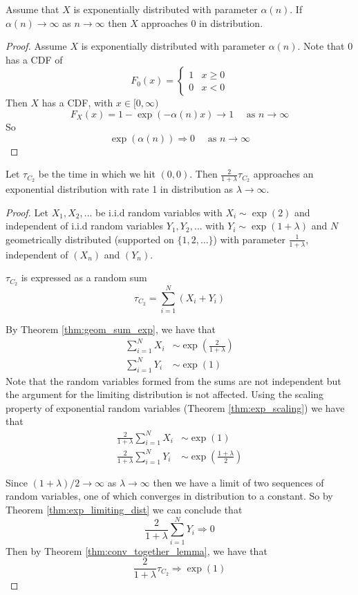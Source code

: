 \begin{theorem}\label{thm:exp_limiting_dist}
Assume that $X$ is exponentially distributed with parameter $\alpha(n)$.
If $\alpha(n) \to \infty$ as $n \to \infty$ then $X$ approaches 0 in distribution.
\end{theorem}

\begin{proof}
Assume $X$ is exponentially distributed with parameter $\alpha(n)$.
Note that 0 has a CDF of
$$
F_0(x) = \begin{cases}
    1 & x \geq 0\\
    0 & x < 0
\end{cases}
$$
Then $X$ has a CDF, with $x \in [0, \infty)$
$$
F_X(x) = 1 - \exp(-\alpha(n) x) \to 1 \quad \text{ as } n \to \infty
$$
So
$$
\exp(\alpha(n)) \Rightarrow 0 \quad \text{ as } n \to \infty
$$
\end{proof}

\begin{theorem}
Let $\tau_{C_2}$ be the time in which we hit $(0,0)$.
Then $\frac{2}{1 + \lambda} \tau_{C_2}$ approaches an exponential distribution with rate 1 in distribution as $\lambda \to \infty$.
\end{theorem}

\begin{proof}
Let $X_1, X_2, \ldots$ be i.i.d random variables with
$X_i \sim \exp(2)$ and independent of i.i.d random variables $Y_1, Y_2, \ldots$ with  $Y_i \sim \exp(1 + \lambda)$ and
$N$ geometrically distributed (supported on $\{1,2,\ldots\}$) with parameter $\frac{1}{1 + \lambda}$, independent of $(X_n)$ and $(Y_n)$.

$\tau_{C_2}$ is expressed as a random sum
$$
\tau_{C_2} = \sum_{i = 1}^N (X_i + Y_i)
$$

By Theorem \ref{thm:geom_sum_exp}, we have that
\begin{align*}
    \sum_{i = 1}^N X_i &\sim \exp\left( \frac{2}{1 + \lambda} \right)\\
    \sum_{i = 1}^N Y_i &\sim \exp( 1 )
\end{align*}
Note that the random variables formed from the sums are not independent but the argument for the limiting distribution is not affected.
Using the scaling property of exponential random variables (Theorem \ref{thm:exp_scaling}) we have that
\begin{align*}
    \frac{2}{1 + \lambda}\sum_{i = 1}^N X_i &\sim \exp( 1 )\\
    \frac{2}{1 + \lambda}\sum_{i = 1}^N Y_i &\sim \exp \left( \frac{1 + \lambda}{2} \right)
\end{align*}

Since $(1 + \lambda)/2 \to \infty$ as $\lambda \to \infty$ then we have a limit of two sequences of random variables, one of which converges in distribution to a constant. So by Theorem \ref{thm:exp_limiting_dist} we can conclude that
$$
\frac{2}{1 + \lambda}\sum_{i = 1}^N Y_i \Rightarrow 0
$$
Then by Theorem \ref{thm:conv_together_lemma}, we have that
$$
\frac{2}{1 + \lambda} \tau_{C_2} \Rightarrow \exp(1)
$$
\end{proof}


